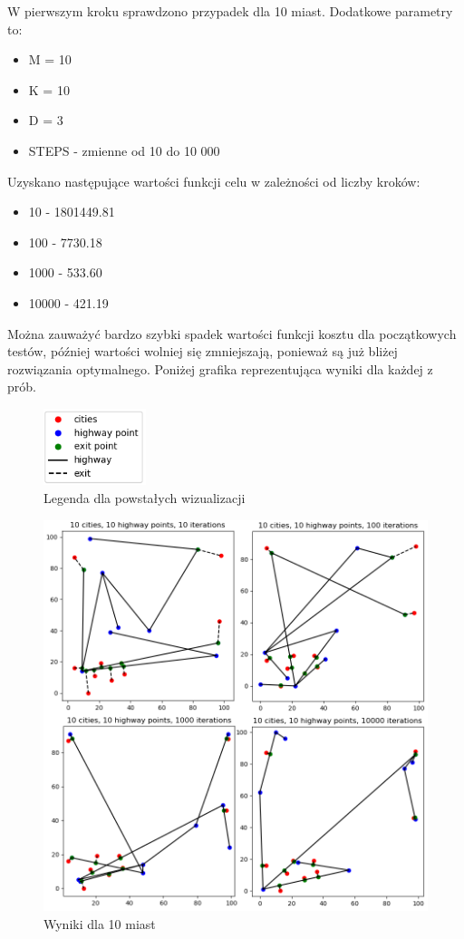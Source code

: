 \documentclass[a4paper]{article}
\begin{document}
W pierwszym kroku sprawdzono przypadek dla 10 miast. Dodatkowe parametry to:
\begin{itemize}
\item M = 10
\item K = 10
\item D = 3
\item STEPS - zmienne od 10 do 10 000
\end{itemize}

Uzyskano następujące wartości funkcji celu w zależności od liczby kroków:
\begin{itemize}
\item 10 - 1801449.81
\item 100 - 7730.18
\item 1000 - 533.60
\item 10000 - 421.19
\end{itemize}

Można zauważyć bardzo szybki spadek wartości funkcji kosztu dla początkowych testów, później wartości wolniej się zmniejszają, ponieważ są już bliżej rozwiązania optymalnego.\newline
Poniżej grafika reprezentująca wyniki dla każdej z prób.
\begin{figure}[h!]
\centering
\includegraphics[width=3cm]{legend}
\caption{Legenda dla powstałych wizualizacji}
\end{figure}
\begin{figure}[h!]
\centering
\includegraphics[width=12cm]{10_cities}
\caption{Wyniki dla 10 miast}
\end{figure}
\end{document}
